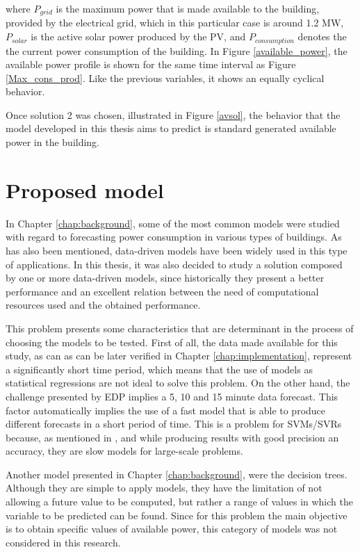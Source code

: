 where $P_{grid}$ is the maximum power that is made available to the building, provided by the electrical grid, which in this particular case is around 1.2 MW, $P_{solar}$ is the active solar power produced by the \ac{PV}, and $P_{consumption}$ denotes the the current power consumption of the building. In Figure \ref{available_power}, the available power profile is shown for the same time interval as Figure \ref{Max_cons_prod}. Like the previous variables, it shows an equally cyclical behavior.

Once solution 2 was chosen, illustrated in Figure \ref{avsol}, the behavior that the model developed in this thesis aims to predict is standard generated available power in the building.

\section{Proposed model}\label{chap4:pm}

In Chapter \ref{chap:background}, some of the most common models were studied with regard to forecasting power consumption in various types of buildings. As has also been mentioned, data-driven models have been widely used in this type of applications. In this thesis, it was also decided to study a solution composed by one or more data-driven models, since historically they present a better performance and an excellent relation between the need of computational resources used and the obtained performance.

This problem presents some characteristics that are determinant in the process of choosing the models to be tested. First of all, the data made available for this study, as can as can be later verified in Chapter \ref{chap:implementation}, represent a significantly short time period, which means that the use of models as statistical regressions are not ideal to solve this problem. On the other hand, the challenge presented by \ac{EDP} implies a 5, 10 and 15 minute data forecast. This factor automatically implies the use of a fast model that is able to produce different forecasts in a short period of time. This is a problem for \ac{SVM}s/\ac{SVR}s because, as mentioned in \cite{svm3}, \cite{svm2} and \cite{svm5} while producing results with good precision an accuracy, they are slow models for large-scale problems. 

Another model presented in Chapter \ref{chap:background}, were the decision trees. Although they are simple to apply models, they have the limitation of not allowing a future value to be computed, but rather a range of values in which the variable to be predicted can be found. Since for this problem the main objective is to obtain specific values of available power, this category of models was not considered in this research.


